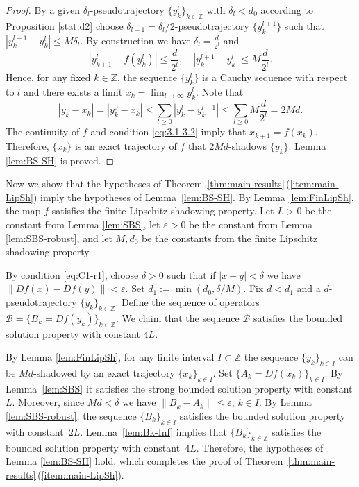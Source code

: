 \documentclass[12pt]{article}
\newcommand{\Zz}{\mathbb{Z}}
\theoremstyle{definition}
\begin{document}
\begin{proof}
By a given $\delta_l$-pseudotrajectory $\{y_k^l\}_{k \in \Zz}$ with $\delta_l < d_0$ according to Proposition  \ref{stat:d2} choose $\delta_{l+1} = \delta_l/2$-pseudotrajectory $\{y_k^{l+1}\}$ such that 
$
|y_k^{l+1} - y_k^l| \leq M \delta_l.
$
By construction we have $\delta_l = \frac{d}{2^l}$ and
\begin{equation}\label{eq:3.1-3.2}
    |y_{k+1}^l - f(y_k^l)| \leq \frac{d}{2^l}, \quad |y_k^{l+1} - y_k^l| \leq M\frac{d}{2^l}.
\end{equation}   
Hence, for any fixed $k \in \Zz$, the sequence $\{y_k^l\}$ is a Cauchy sequence with respect to $l$ and there exists a limit
$
x_k = \lim_{l \to \infty} y_k^l.
$
Note that
\begin{equation}\label{eq:42.5}
|y_k - x_k| = |y_k^0 - x_k| \leq \sum_{l\geq 0} |y_k^l-y_k^{l+1}| \leq \sum_{l\geq 0}M\frac{d}{2^l} = 2Md.    
\end{equation}
The continuity of $f$ and condition \eqref{eq:3.1-3.2} imply that $x_{k+1} = f(x_k)$. Therefore, $\{x_k\}$ is an exact trajectory of $f$ that $2Md$-shadows $\{y_k\}$. Lemma \ref{lem:BS-SH} is proved.
\end{proof}

Now we show that the hypotheses of Theorem~\ref{thm:main-results}\,(\ref{item:main-LipSh}) imply the hypotheses of Lemma~\ref{lem:BS-SH}. By Lemma \ref{lem:FinLipSh}, the map $f$ satisfies the finite Lipschitz shadowing property. Let $L > 0$ be the constant from Lemma \ref{lem:SBS}, let $\varepsilon > 0$ be the constant from Lemma \ref{lem:SBS-robust}, and let $M, d_0$ be the constants from the finite Lipschitz shadowing property. 

By condition \eqref{eq:C1-r1}, choose $\delta > 0$ such that if $|x - y|< \delta$ we have $\|Df(x)-Df(y)\| < \varepsilon$. Set $d_1 := \min(d_0, \delta/M)$. Fix $d<d_1$ and a $d$-pseudotrajectory $\{y_k\}_{k \in \Zz}$. Define the sequence of operators $\mathcal{B} = \{B_k = Df(y_k)\}_{k \in \Zz}$. We claim that the sequence $\mathcal{B}$ satisfies the bounded solution property with constant $4L$.

By Lemma \ref{lem:FinLipSh}, for any finite interval $I \subset \Zz$ the sequence $\{y_k\}_{k \in I}$ can be $Md$-shadowed by an exact trajectory $\{x_k\}_{k \in I}$. Set $\{A_k = Df(x_k)\}_{k \in I}$. By Lemma~\ref{lem:SBS} it satisfies the strong bounded solution property with constant $L$. Moreover, since $Md < \delta$ we have $\|B_k - A_k\| \leq \varepsilon$, $k \in I$.
By Lemma \ref{lem:SBS-robust}, the sequence $\{B_k\}_{k \in I}$ satisfies the bounded solution property with constant~$2L$. Lemma~\ref{lem:Bk-Inf} implies that $\{B_k\}_{k \in \Zz}$ satisfies the bounded solution property with constant~$4L$. Therefore, the hypotheses of Lemma \ref{lem:BS-SH} hold, which completes the proof of Theorem~\ref{thm:main-results}\,(\ref{item:main-LipSh}).
\end{document}
